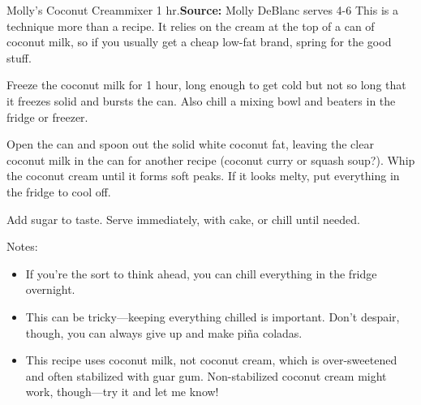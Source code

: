\begin{recipe}{Molly's Coconut Cream}{mixer \hfill 1 hr.}{\textbf{Source:} Molly DeBlanc \hfill serves 4-6}
  \freeform This is a technique more than a recipe. It relies on the cream at the top of a can of coconut milk, so if you usually get a cheap low-fat brand, spring for the good stuff.

Freeze the coconut milk for 1 hour, long enough to get cold but not so long that it freezes solid and bursts the can. Also chill a mixing bowl and beaters in the fridge or freezer.

\newstep Open the can and spoon out the solid white coconut fat, leaving the clear coconut milk in the can for another recipe (coconut curry or squash soup?). Whip the coconut cream until it forms soft peaks. If it looks melty, put everything in the fridge to cool off.

Add sugar to taste. Serve immediately, with cake, or chill until needed.

\freeform Notes:
\begin{itemize}
  \item If you're the sort to think ahead, you can chill everything in the fridge overnight.
  \item This can be tricky---keeping everything chilled is important. Don't despair, though, you can always give up and make pi\~na coladas.
  \item This recipe uses coconut milk, not coconut cream, which is over-sweetened and often stabilized with guar gum. Non-stabilized coconut cream might work, though---try it and let me know!
\end{itemize}
\end{recipe}
